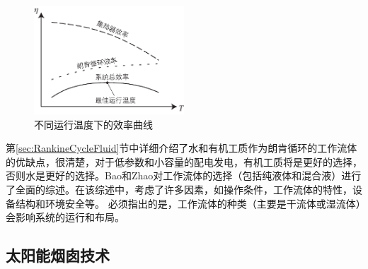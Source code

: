 \begin{figure}[!ht]
\centering 
\includegraphics[width=0.5\textwidth]{fig/Efficiency}
\caption{不同运行温度下的效率曲线}\label{fig:Efficiency}
\end{figure}

第\ref{sec:RankineCycleFluid}节中详细介绍了水和有机工质作为朗肯循环的工作流体的优缺点，很清楚，对于低参数和小容量的配电发电，有机工质将是更好的选择，否则水是更好的选择。Bao和Zhao\cite{Bao2013}对工作流体的选择（包括纯液体和混合液）进行了全面的综述。在该综述中，考虑了许多因素，如操作条件，工作流体的特性，设备结构和环境安全等。
必须指出的是，工作流体的种类（主要是干流体或湿流体）会影响系统的运行和布局。

\subsection{太阳能烟囱技术}

